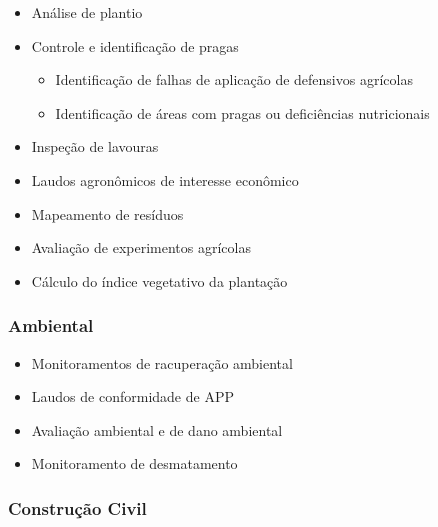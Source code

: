 \begin{itemize}
	\item Análise de plantio
	\item Controle e identificação de pragas
	\begin{itemize}
		\item Identificação de falhas de aplicação de defensivos agrícolas
		\item Identificação de áreas com pragas ou deficiências nutricionais
	\end{itemize}
	\item Inspeção de lavouras
	\item Laudos agronômicos de interesse econômico
	\item Mapeamento de resíduos
	\item Avaliação de experimentos agrícolas
	\item Cálculo do índice vegetativo da plantação
\end{itemize}

\subsubsection*{Ambiental}

\begin{itemize}
	\item Monitoramentos de racuperação ambiental
	\item Laudos de conformidade de APP
	\item Avaliação ambiental e de dano ambiental
	\item Monitoramento de desmatamento
\end{itemize}

\subsubsection*{Construção Civil}

